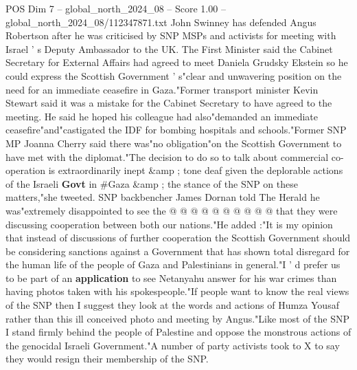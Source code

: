 \begin{textsample}{POS Dim 7 – global\_north\_2024\_08 – Score 1.00 – global\_north\_2024\_08/112347871.txt}  \label{ex:f7_pos_369}
John Swinney has defended Angus Robertson after he was criticised by SNP MSPs and activists for meeting with Israel ' s Deputy Ambassador to the UK.
The First Minister said the Cabinet Secretary for External Affairs had agreed to meet Daniela Grudsky Ekstein so he could express the Scottish Government ' s"clear and unwavering position on the need for an immediate ceasefire in Gaza."Former transport minister Kevin Stewart said it was a mistake for the Cabinet Secretary to have agreed to the meeting.
He said he hoped his colleague had also"demanded an immediate ceasefire"and"castigated the IDF for bombing hospitals and schools."Former SNP MP Joanna Cherry said there was"no obligation"on the Scottish Government to have met with the diplomat."The decision to do so to talk about commercial co-operation is extraordinarily inept \&amp ; tone deaf given the deplorable actions of the Israeli \textbf{Govt} in \#Gaza \&amp ; the stance of the SNP on these matters,"she tweeted.
SNP backbencher James Dornan told The Herald he was"extremely disappointed to see the @ @ @ @ @ @ @ @ @ @ that they were discussing cooperation between both our nations."He added :"It is my opinion that instead of discussions of further cooperation the Scottish Government should be considering sanctions against a Government that has shown total disregard for the human life of the people of Gaza and Palestinians in general."I ' d prefer us to be part of an \textbf{application} to see Netanyahu answer for his war crimes than having photos taken with his spokespeople."If people want to know the real views of the SNP then I suggest they look at the words and actions of Humza Yousaf rather than this ill conceived photo and meeting by Angus."Like most of the SNP I stand firmly behind the people of Palestine and oppose the monstrous actions of the genocidal Israeli Government."A number of party activists took to X to say they would resign their membership of the SNP.

\end{textsample}
